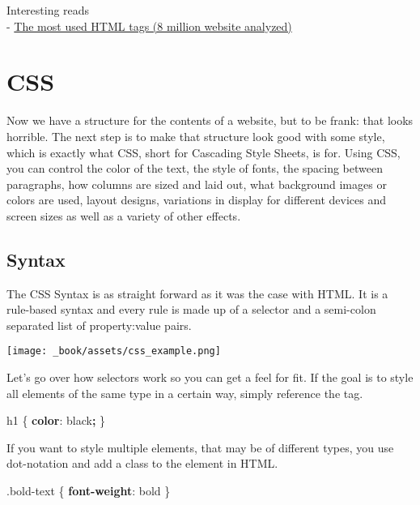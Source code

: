 \documentclass[
]{book}
\newenvironment{Shaded}{\begin{snugshade}}{\end{snugshade}}
\newcommand{\ConstantTok}[1]{\textcolor[rgb]{0.00,0.00,0.00}{#1}}
\newcommand{\DecValTok}[1]{\textcolor[rgb]{0.00,0.00,0.81}{#1}}
\newcommand{\FunctionTok}[1]{\textcolor[rgb]{0.00,0.00,0.00}{#1}}
\newcommand{\KeywordTok}[1]{\textcolor[rgb]{0.13,0.29,0.53}{\textbf{#1}}}
\newcommand{\NormalTok}[1]{#1}
\newcommand{\OperatorTok}[1]{\textcolor[rgb]{0.81,0.36,0.00}{\textbf{#1}}}
\begin{document}
Interesting reads\\
- \href{https://css-tricks.com/average-web-page-data-analyzing-8-million-websites/}{The most used HTML tags (8 million website analyzed)}

\hypertarget{css}{%
\section{CSS}\label{css}}

Now we have a structure for the contents of a website, but to be frank: that looks horrible. The next step is to make that structure look good with some style, which is exactly what CSS, short for Cascading Style Sheets, is for. Using CSS, you can control the color of the text, the style of fonts, the spacing between paragraphs, how columns are sized and laid out, what background images or colors are used, layout designs, variations in display for different devices and screen sizes as well as a variety of other effects.

\hypertarget{syntax}{%
\subsection*{Syntax}\label{syntax}}

The CSS Syntax is as straight forward as it was the case with HTML. It is a rule-based syntax and every rule is made up of a selector and a semi-colon separated list of property:value pairs.

\texttt{[image: \_book/assets/css\_example.png]}

Let's go over how selectors work so you can get a feel for fit. If the goal is to style all elements of the same type in a certain way, simply reference the tag.

\begin{Shaded}
\begin{Highlighting}[]
\NormalTok{h1 \{}
  \KeywordTok{color}\NormalTok{: }\ConstantTok{black}\OperatorTok{;}
\NormalTok{\}}
\end{Highlighting}
\end{Shaded}

If you want to style multiple elements, that may be of different types, you use dot-notation and add a class to the element in HTML.

\begin{Shaded}
\begin{Highlighting}[]
\FunctionTok{.bold{-}text}\NormalTok{ \{                           }
  \KeywordTok{font{-}weight}\NormalTok{: }\DecValTok{bold}
\NormalTok{\}}
\end{Highlighting}
\end{Shaded}
\end{document}
